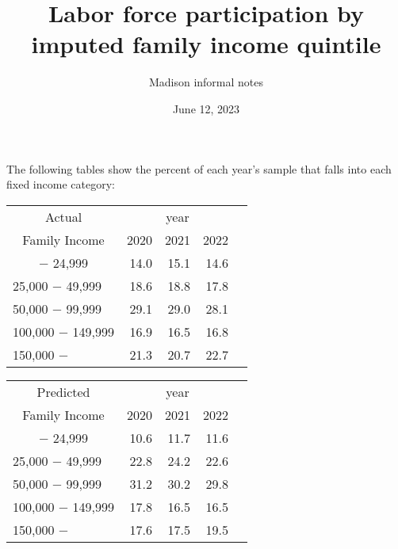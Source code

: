\documentclass{article}
\title{Labor force participation by imputed family income quintile}
\author{Madison informal notes}
\date{June 12, 2023}
\begin{document}
	\maketitle
	
	 
	The following tables show the percent of each year's sample that falls into each fixed income category: 
	
	\begin{minipage}[b]{.40\textwidth}
		\centering
		\begin{tabular}{lllll}
			\cline{1-4}
			\multicolumn{1}{c}{Actual} &
			\multicolumn{3}{|c}{year} \\
			\multicolumn{1}{c}{Family Income} &
			\multicolumn{1}{|r}{2020} &
			\multicolumn{1}{r}{2021} &
			\multicolumn{1}{r}{2022}  \\
			\cline{1-4}
			\multicolumn{1}{c}{$-$ 24,999} &
			\multicolumn{1}{|r}{14.0} &
			\multicolumn{1}{r}{15.1} &
			\multicolumn{1}{r}{14.6} \\
			\multicolumn{1}{l}{25,000 $-$ 49,999} &
			\multicolumn{1}{|r}{18.6} &
			\multicolumn{1}{r}{18.8} &
			\multicolumn{1}{r}{17.8} \\
			\multicolumn{1}{l}{50,000 $-$ 99,999} &
			\multicolumn{1}{|r}{29.1} &
			\multicolumn{1}{r}{29.0} &
			\multicolumn{1}{r}{28.1}  \\
			\multicolumn{1}{l}{100,000 $-$ 149,999} &
			\multicolumn{1}{|r}{16.9} &
			\multicolumn{1}{r}{16.5} &
			\multicolumn{1}{r}{16.8} \\
			\multicolumn{1}{l}{150,000 $-$} &
			\multicolumn{1}{|r}{21.3} &
			\multicolumn{1}{r}{20.7} &
			\multicolumn{1}{r}{22.7} \\
			\cline{1-4}
		\end{tabular}
	\end{minipage}\qquad
	\begin{minipage}[b]{.40\textwidth}
		\centering
		\begin{tabular}{lllll}
			\cline{1-4}
			\multicolumn{1}{c}{Predicted} &
			\multicolumn{3}{|c}{year} \\
			\multicolumn{1}{c}{Family Income} &
			\multicolumn{1}{|r}{2020} &
			\multicolumn{1}{r}{2021} &
			\multicolumn{1}{r}{2022} \\
			\cline{1-4}
			\multicolumn{1}{c}{$-$ 24,999} &
			\multicolumn{1}{|r}{10.6} &
			\multicolumn{1}{r}{11.7} &
			\multicolumn{1}{r}{11.6} \\
			\multicolumn{1}{l}{25,000 $-$ 49,999} &
			\multicolumn{1}{|r}{22.8} &
			\multicolumn{1}{r}{24.2} &
			\multicolumn{1}{r}{22.6} \\
			\multicolumn{1}{l}{50,000 $-$ 99,999} &
			\multicolumn{1}{|r}{31.2} &
			\multicolumn{1}{r}{30.2} &
			\multicolumn{1}{r}{29.8} \\
			\multicolumn{1}{l}{100,000 $-$ 149,999} &
			\multicolumn{1}{|r}{17.8} &
			\multicolumn{1}{r}{16.5} &
			\multicolumn{1}{r}{16.5} \\
			\multicolumn{1}{l}{150,000 $-$} &
			\multicolumn{1}{|r}{17.6} &
			\multicolumn{1}{r}{17.5} &
			\multicolumn{1}{r}{19.5} \\
			\cline{1-4}
		\end{tabular}
	\end{minipage}
	
\end{document}
